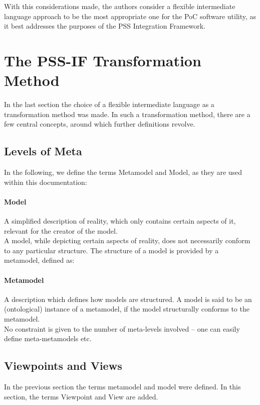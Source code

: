 With this considerations made, the authors consider a flexible intermediate language approach to be the most appropriate one for the PoC software utility, as it best addresses the purposes of the PSS Integration Framework.

\section{The PSS-IF Transformation Method}
\label{sec:approach:pssif}

In the last section the choice of a flexible intermediate language as a transformation method was made. In such a transformation method, there are a few central concepts, around which further definitions revolve.

\subsection{Levels of Meta}

In the following, we define the terms Metamodel and Model, as they are used within this documentation:

\paragraph{Model} A simplified description of reality, which only contains certain aspects of it, relevant for the creator of the model.\\

A model, while depicting certain aspects of reality, does not necessarily conform to any particular structure. The structure of a model is provided by a metamodel, defined as:

\paragraph{Metamodel} A description which defines how models are structured. A model is said to be an (ontological) instance of a metamodel, if the model structurally conforms to the metamodel.\\

No constraint is given to the number of meta-levels involved -- one can easily define meta-metamodels etc.

\subsection{Viewpoints and Views}

In the previous section the terms metamodel and model were defined. In this section, the terms Viewpoint and View are added.

